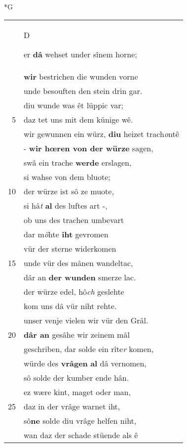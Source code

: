 \documentclass[8pt,a4paper,notitlepage]{article}
\begin{document}
\begin{table}[ht]
\begin{minipage}[t]{0.5\linewidth}
\small
\begin{center}*G
\end{center}
\begin{tabular}{rl}
 & \begin{large}D\end{large}er \textbf{dâ} wehset under sînem horne;\\ 
 & \textbf{wir} bestrichen die wunden vorne\\ 
 & unde besouften den stein drin gar.\\ 
 & diu wunde was êt lüppic var;\\ 
5 & daz tet uns mit dem künige wê.\\ 
 & wir gewunnen ein würz, \textbf{diu} heizet trach\textit{o}ntê\\ 
 & - \textbf{wir hœren von der würze} sagen,\\ 
 & swâ ein trache \textbf{werde} erslagen,\\ 
 & si wahse von dem bluote;\\ 
10 & der würze ist sô ze muote,\\ 
 & si hâ\textit{t} \textbf{al} des luftes art -,\\ 
 & ob uns des trachen umbevart\\ 
 & dar m\textit{ö}hte \textbf{iht} gevromen\\ 
 & vür der sterne widerkomen\\ 
15 & unde vür des mânen wandeltac,\\ 
 & dâr an \textbf{der wunden} smerze lac.\\ 
 & der würze edel, hô\textit{ch} geslehte\\ 
 & kom uns dâ vür niht rehte.\\ 
 & unser venje vielen wir vür den Grâl.\\ 
20 & \textbf{dâr an} gesâhe wir zeinem mâl\\ 
 & geschriben, dar solde ein rîte\textit{r} komen,\\ 
 & würde des \textbf{vrâgen} \textbf{al} dâ vernomen,\\ 
 & sô solde der kumber ende hân.\\ 
 & ez wære kint, maget oder man,\\ 
25 & daz in der vrâge warnet iht,\\ 
 & sô\textbf{ne} solde diu vrâge helfen niht,\\ 
 & wan daz der schade stüende als ê\\ 

\end{tabular}
\end{minipage}
\end{table}
\end{document}
